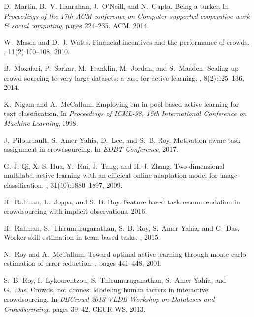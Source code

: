 \documentclass[11pt]{article}
\begin{document}
\begin{thebibliography}{10}
	D.~Martin, B.~V. Hanrahan, J.~O'Neill, and N.~Gupta.
	\newblock Being a turker.
	\newblock In {\em Proceedings of the 17th ACM conference on Computer supported
		cooperative work \& social computing}, pages 224--235. ACM, 2014.
	
	W.~Mason and D.~J. Watts.
	\newblock Financial incentives and the performance of crowds.
	, 11(2):100--108, 2010.
	
	B.~Mozafari, P.~Sarkar, M.~Franklin, M.~Jordan, and S.~Madden.
	\newblock Scaling up crowd-sourcing to very large datasets: a case for active
	learning.
	, 8(2):125--136, 2014.
	
	K.~Nigam and A.~McCallum.
	\newblock Employing em in pool-based active learning for text classification.
	\newblock In {\em Proceedings of ICML-98, 15th International Conference on
		Machine Learning}, 1998.
	
	J.~Pilourdault, S.~Amer-Yahia, D.~Lee, and S.~B. Roy.
	\newblock Motivation-aware task assignment in crowdsourcing.
	\newblock In {\em EDBT Conference}, 2017.
	
	G.-J. Qi, X.-S. Hua, Y.~Rui, J.~Tang, and H.-J. Zhang.
	\newblock Two-dimensional multilabel active learning with an efficient online
	adaptation model for image classification.
	, 31(10):1880--1897, 2009.
	
	H.~Rahman, L.~Joppa, and S.~B. Roy.
	\newblock Feature based task recommendation in crowdsourcing with implicit
	observations, 2016.
	
	H.~Rahman, S.~Thirumuruganathan, S.~B. Roy, S.~Amer{-}Yahia, and G.~Das.
	\newblock Worker skill estimation in team based tasks.
	, 2015.
	
	N.~Roy and A.~McCallum.
	\newblock Toward optimal active learning through monte carlo estimation of
	error reduction.
	, pages 441--448, 2001.
	
	S.~B. Roy, I.~Lykourentzou, S.~Thirumuruganathan, S.~Amer-Yahia, and G.~Das.
	\newblock Crowds, not drones: Modeling human factors in interactive
	crowdsourcing.
	\newblock In {\em DBCrowd 2013-VLDB Workshop on Databases and Crowdsourcing},
	pages 39--42. CEUR-WS, 2013.
	

\end{thebibliography}
\end{document}
